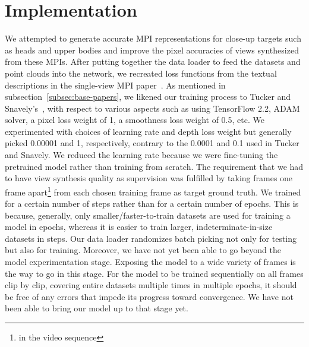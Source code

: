 \section{Implementation}\label{sec:implementation} 

We attempted to generate accurate MPI representations for close-up targets such as heads and upper bodies and improve the pixel accuracies of views synthesized from these MPIs. After putting together the data loader to feed the datasets and point clouds into the network, we recreated loss functions from the textual descriptions in the single-view MPI paper~\cite{single_view_mpi}. As mentioned in subsection~\ref{subsec:base-papers}, we likened our training process to Tucker and Snavely's~\cite{single_view_mpi}, with respect to various aspects such as using TensorFlow 2.2, ADAM solver, a pixel loss weight of 1, a smoothness loss weight of 0.5, etc. We experimented with choices of learning rate and depth loss weight but generally picked 0.00001 and 1, respectively, contrary to the 0.0001 and 0.1 used in Tucker and Snavely. We reduced the learning rate because we were fine-tuning the pretrained model rather than training from scratch. The requirement that we had to have view synthesis quality as supervision was fulfilled by taking frames one frame apart\footnote{in the video sequence} from each chosen training frame as target ground truth. We trained for a certain number of steps rather than for a certain number of epochs. This is because, generally, only smaller/faster-to-train datasets are used for training a model in epochs, whereas it is easier to train larger, indeterminate-in-size datasets in steps. Our data loader randomizes batch picking not only for testing but also for training. Moreover, we have not yet been able to go beyond the model experimentation stage. Exposing the model to a wide variety of frames is the way to go in this stage. For the model to be trained sequentially on all frames clip by clip, covering entire datasets multiple times in multiple epochs, it should be free of any errors that impede its progress toward convergence. We have not been able to bring our model up to that stage yet. 

